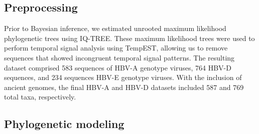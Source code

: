 \subsection{Preprocessing}

Prior to Bayesian inference, we estimated unrooted maximum likelihood phylogenetic trees using IQ-TREE. %
These maximum likelihood trees were used to perform temporal signal analysis using TempEST, %
allowing us to remove sequences that showed incongruent temporal signal patterns.
The resulting dataset comprised 583 sequences of HBV-A genotype viruses, 764 HBV-D sequences, and 234 sequences HBV-E genotype viruses.
With the inclusion of ancient genomes, the final HBV-A and HBV-D datasets included 587 and 769 total taxa, respectively.

\subsection{Phylogenetic modeling}

